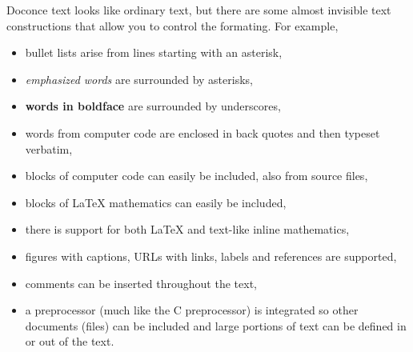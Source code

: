 \documentclass{article}
\begin{document}
Doconce text looks like ordinary text, but there are some almost invisible
text constructions that allow you to control the formating. For example,

\begin{itemize}
  \item bullet lists arise from lines starting with an asterisk,

  \item \emph{emphasized words} are surrounded by asterisks, 

  \item \textbf{words in boldface} are surrounded by underscores, 

  \item words from computer code are enclosed in back quotes and 
    then typeset verbatim,

  \item blocks of computer code can easily be included, also from source files,

  \item blocks of {\LaTeX} mathematics can easily be included,

  \item there is support for both {\LaTeX} and text-like inline mathematics,

  \item figures with captions, URLs with links, labels and references
    are supported,

  \item comments can be inserted throughout the text,

  \item a preprocessor (much like the C preprocessor) is integrated so
    other documents (files) can be included and large portions of text
    can be defined in or out of the text.
\end{itemize}
\end{document}
